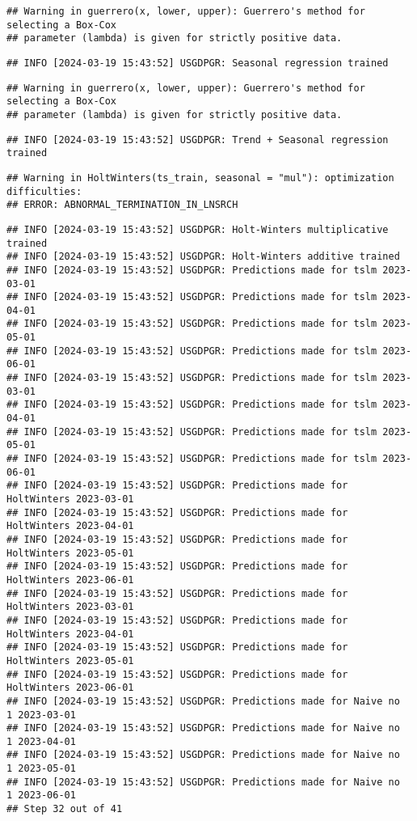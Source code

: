 \documentclass[
]{article}
\begin{document}
\begin{verbatim}
## Warning in guerrero(x, lower, upper): Guerrero's method for selecting a Box-Cox
## parameter (lambda) is given for strictly positive data.
\end{verbatim}

\begin{verbatim}
## INFO [2024-03-19 15:43:52] USGDPGR: Seasonal regression trained
\end{verbatim}

\begin{verbatim}
## Warning in guerrero(x, lower, upper): Guerrero's method for selecting a Box-Cox
## parameter (lambda) is given for strictly positive data.
\end{verbatim}

\begin{verbatim}
## INFO [2024-03-19 15:43:52] USGDPGR: Trend + Seasonal regression trained
\end{verbatim}

\begin{verbatim}
## Warning in HoltWinters(ts_train, seasonal = "mul"): optimization difficulties:
## ERROR: ABNORMAL_TERMINATION_IN_LNSRCH
\end{verbatim}

\begin{verbatim}
## INFO [2024-03-19 15:43:52] USGDPGR: Holt-Winters multiplicative trained
## INFO [2024-03-19 15:43:52] USGDPGR: Holt-Winters additive trained
## INFO [2024-03-19 15:43:52] USGDPGR: Predictions made for tslm 2023-03-01
## INFO [2024-03-19 15:43:52] USGDPGR: Predictions made for tslm 2023-04-01
## INFO [2024-03-19 15:43:52] USGDPGR: Predictions made for tslm 2023-05-01
## INFO [2024-03-19 15:43:52] USGDPGR: Predictions made for tslm 2023-06-01
## INFO [2024-03-19 15:43:52] USGDPGR: Predictions made for tslm 2023-03-01
## INFO [2024-03-19 15:43:52] USGDPGR: Predictions made for tslm 2023-04-01
## INFO [2024-03-19 15:43:52] USGDPGR: Predictions made for tslm 2023-05-01
## INFO [2024-03-19 15:43:52] USGDPGR: Predictions made for tslm 2023-06-01
## INFO [2024-03-19 15:43:52] USGDPGR: Predictions made for HoltWinters 2023-03-01
## INFO [2024-03-19 15:43:52] USGDPGR: Predictions made for HoltWinters 2023-04-01
## INFO [2024-03-19 15:43:52] USGDPGR: Predictions made for HoltWinters 2023-05-01
## INFO [2024-03-19 15:43:52] USGDPGR: Predictions made for HoltWinters 2023-06-01
## INFO [2024-03-19 15:43:52] USGDPGR: Predictions made for HoltWinters 2023-03-01
## INFO [2024-03-19 15:43:52] USGDPGR: Predictions made for HoltWinters 2023-04-01
## INFO [2024-03-19 15:43:52] USGDPGR: Predictions made for HoltWinters 2023-05-01
## INFO [2024-03-19 15:43:52] USGDPGR: Predictions made for HoltWinters 2023-06-01
## INFO [2024-03-19 15:43:52] USGDPGR: Predictions made for Naive no  1 2023-03-01
## INFO [2024-03-19 15:43:52] USGDPGR: Predictions made for Naive no  1 2023-04-01
## INFO [2024-03-19 15:43:52] USGDPGR: Predictions made for Naive no  1 2023-05-01
## INFO [2024-03-19 15:43:52] USGDPGR: Predictions made for Naive no  1 2023-06-01
## Step 32 out of 41
\end{verbatim}
\end{document}
